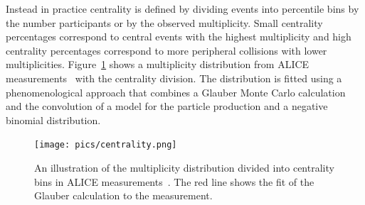
Instead in practice centrality is defined by dividing events into percentile bins by the number participants or by the observed multiplicity. Small centrality percentages correspond to central events with the highest multiplicity and high centrality percentages correspond to more peripheral collisions with lower multiplicities. Figure~\ref{fig:centrality} shows a multiplicity distribution from ALICE measurements~\cite{PhysRevC.88.044909} with the centrality division. The distribution is fitted using a phenomenological approach that combines a Glauber Monte Carlo calculation~\cite{Miller:2007ri} and the convolution of a model for the particle production and a negative binomial distribution. 


\begin{figure}[tb]
\centering

               \texttt{[image: pics/centrality.png]}
        \caption[An illustration of the multiplicity distribution in ALICE measurement with centrality classes.]{An illustration of the multiplicity distribution divided into centrality bins in ALICE measurements~\cite{PhysRevC.88.044909}. The red line shows the fit of the Glauber calculation to the measurement.}
        	\label{fig:centrality}
\end{figure}

